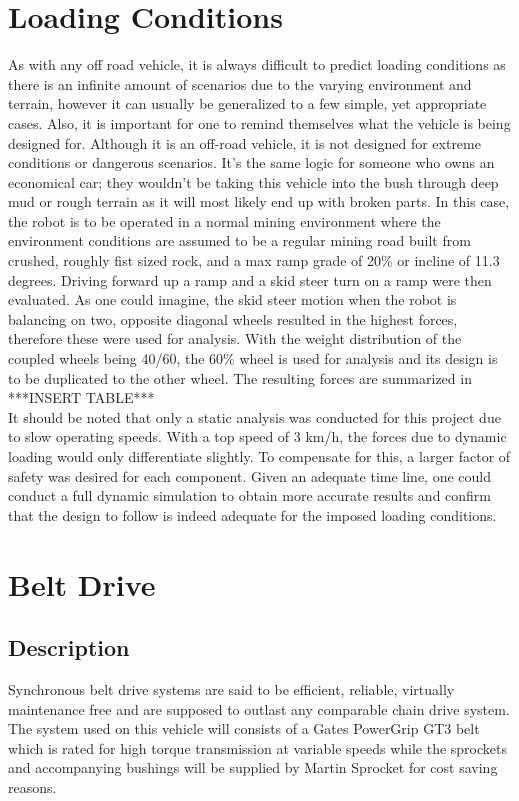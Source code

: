 \section{Loading Conditions}
As with any off road vehicle, it is always difficult to predict loading conditions as there is an infinite amount of scenarios due to the varying environment and terrain, however it can usually be generalized to a few simple, yet appropriate cases. Also, it is important for one to remind themselves what the vehicle is being designed for. Although it is an off-road vehicle, it is not designed for extreme conditions or dangerous scenarios. It's the same logic for someone who owns an economical car; they wouldn't be taking this vehicle into the bush through deep mud or rough terrain as it will most likely end up with broken parts. In this case, the robot is to be operated in a normal mining environment where the environment conditions are assumed to be a regular mining road built from crushed, roughly fist sized rock, and a max ramp grade of 20\% or incline of 11.3 degrees. Driving forward up a ramp and a skid steer turn on a ramp were then evaluated. As one could imagine, the skid steer motion when the robot is balancing on two, opposite diagonal wheels resulted in the highest forces, therefore these were used for analysis. With the weight distribution of the coupled wheels being 40/60, the 60\% wheel is used for analysis and its design is to be duplicated to the other wheel. The resulting forces are summarized in     
\\
 ***INSERT TABLE***
\\
It should be noted that only a static analysis was conducted for this project due to slow operating speeds. With a top speed of 3 km/h, the forces due to dynamic loading would only differentiate slightly. To compensate for this, a larger factor of safety was desired for each component. Given an adequate time line, one could conduct a full dynamic simulation to obtain more accurate results and confirm that the design to follow is indeed adequate for the imposed loading conditions. 

\section{Belt Drive}
\subsection{Description}
Synchronous belt drive systems are said to be efficient, reliable, virtually maintenance free and are supposed to outlast any comparable chain drive system. The system used on this vehicle will consists of a Gates PowerGrip GT3 belt which is rated for high torque transmission at variable speeds while the sprockets and accompanying bushings will be supplied by Martin Sprocket for cost saving reasons.
